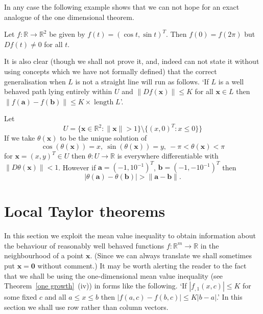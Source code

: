 In any case the following example shows that we can
not hope for an exact analogue of the one dimensional
theorem.
\begin{example} Let $f:{\mathbb R}\rightarrow{\mathbb R}^{2}$
be given by $f(t)=(\cos t,\sin t)^{T}$. Then
$f(0)=f(2\pi)$ but $Df(t)\neq 0$ for all $t$.
\end{example}
It is also clear (though we shall not prove it,
and, indeed can not state it without using concepts
which we have not formally defined) that the
correct generalisation when $L$ is not a straight
line will run as follows.
`If  $L$ is a well behaved path lying entirely
within $U$  and
$\|Df({\mathbf x})\|\leq K$ for all
${\mathbf x}\in L$ then
$\|f({\mathbf a})-f({\mathbf b})\|
\leq K\times\operatorname{length}L$'.
\begin{example} Let
\[U=\{{\mathbf x}\in{\mathbb R}^{2}:\|{\mathbf x}\|>1\}
\setminus\{(x,0)^{T}:x\leq 0\}\}\]
If we take $\theta({\mathbf x})$ to be the unique solution 
of
\[\cos(\theta({\mathbf x}))=x,\ \sin(\theta({\mathbf x}))=y,
\ -\pi<\theta(\mathbf x)<\pi\]
for ${\mathbf x}=(x,y)^{T}\in U$ then
$\theta:U\rightarrow{\mathbb R}$ is everywhere differentiable
with $\|D\theta({\mathbf x})\|<1$. However
if $\mathbf{a}=(-1,10^{-1})^{T}$, $\mathbf{b}=(-1,-10^{-1})^{T}$
then 
\[|\theta(\mathbf{a})-\theta(\mathbf{b})|>                  
\|\mathbf{a}-\mathbf{b}\|.\]
\end{example}
\section{Local Taylor theorems} In this section we exploit
the mean value inequality to obtain information  about
the behaviour of reasonably well behaved functions
$f:{\mathbb R}^{m}\rightarrow{\mathbb R}$ in the neighbourhood
of a point ${\mathbf x}$. (Since we can always translate 
we shall sometimes put ${\mathbf x}={\mathbf 0}$ without
comment.) It may be worth alerting the reader to the
fact that we shall be using the one-dimensional
mean value inequality (see
Theorem~\ref{one growth}~(iv)) in forms like the following.
`If $|f_{,1}(x,c)|\leq K$  for some fixed $c$ and
all $a\leq x\leq b$ then $|f(a,c)-f(b,c)|\leq K|b-a|$.'
In this section we shall use row rather than column 
vectors.

